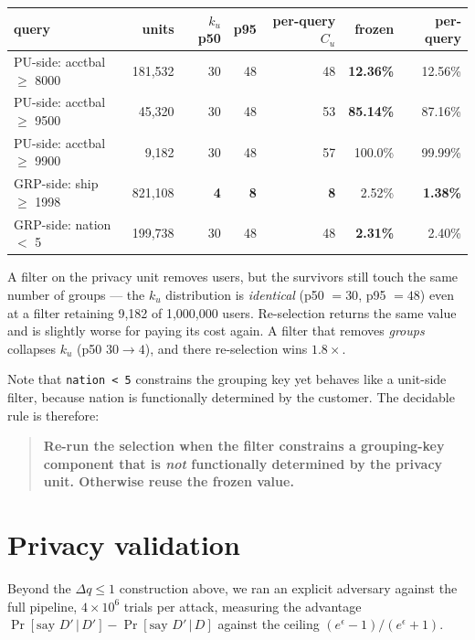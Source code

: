 \documentclass[11pt,a4paper]{article}
\newcommand{\Cu}{C_u}
\newcommand{\ku}{k_u}
\begin{document}
\begin{center}\small
\begin{tabular}{lrrrrrr}
\toprule
query & units & $\ku$ p50 & p95 & per-query $\Cu$ & frozen & per-query \\
\midrule
PU-side: acctbal $\ge$ 8000 & 181,532 & 30 & 48 & 48 & \textbf{12.36\%} & 12.56\% \\
PU-side: acctbal $\ge$ 9500 &  45,320 & 30 & 48 & 53 & \textbf{85.14\%} & 87.16\% \\
PU-side: acctbal $\ge$ 9900 &   9,182 & 30 & 48 & 57 & 100.0\% & 99.99\% \\
GRP-side: ship $\ge$ 1998   & 821,108 & \textbf{4} & \textbf{8} & \textbf{8} & 2.52\% & \textbf{1.38\%} \\
GRP-side: nation $<$ 5      & 199,738 & 30 & 48 & 48 & \textbf{2.31\%} & 2.40\% \\
\bottomrule
\end{tabular}
\end{center}

A filter on the privacy unit removes users, but the survivors still touch the same number of groups
--- the $\ku$ distribution is \emph{identical} (p50 $=30$, p95 $=48$) even at a filter retaining
9,182 of 1,000,000 users. Re-selection returns the same value and is slightly worse for paying its
cost again. A filter that removes \emph{groups} collapses $\ku$ (p50 $30\to4$), and there
re-selection wins $1.8\times$.

Note that \texttt{nation < 5} constrains the grouping key yet behaves like a unit-side filter,
because nation is functionally determined by the customer. The decidable rule is therefore:

\begin{quote}
\textbf{Re-run the selection when the filter constrains a grouping-key component that is \emph{not}
functionally determined by the privacy unit. Otherwise reuse the frozen value.}
\end{quote}

\section{Privacy validation}\label{sec:privacy}

Beyond the $\Delta q \le 1$ construction above, we ran an explicit adversary against the full
pipeline, $4\times10^6$ trials per attack, measuring the advantage
$\Pr[\text{say } D'\,|\,D'] - \Pr[\text{say } D'\,|\,D]$ against the ceiling
$(e^\epsilon-1)/(e^\epsilon+1)$.
\end{document}
